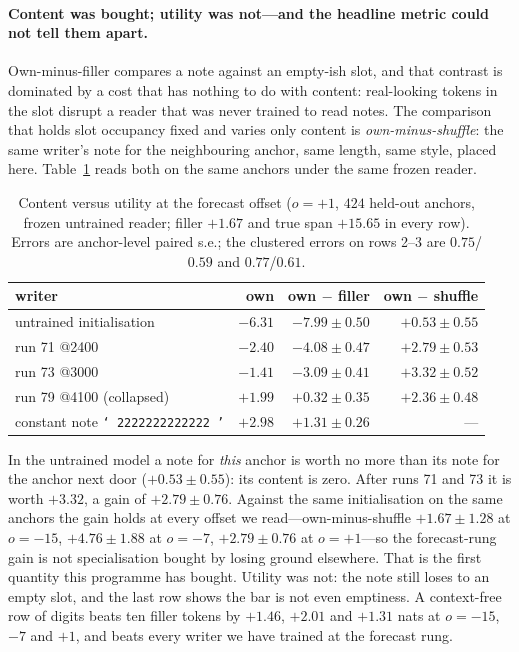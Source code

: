 \documentclass{article} %
\begin{document}
\paragraph{Content was bought; utility was not---and the headline metric could not tell them apart.}
Own-minus-filler compares a note against an empty-ish slot, and that contrast is dominated by a cost that
has nothing to do with content: real-looking tokens in the slot disrupt a reader that was never trained to
read notes. The comparison that holds slot occupancy fixed and varies only content is \emph{own-minus-shuffle}:
the same writer's note for the neighbouring anchor, same length, same style, placed here.
Table~\ref{tab:content} reads both on the same anchors under the same frozen reader.

\begin{table}[h]
\centering
\small
\caption{Content versus utility at the forecast offset ($o=+1$, $424$ held-out anchors, frozen untrained
reader; filler $+1.67$ and true span $+15.65$ in every row). Errors are anchor-level paired s.e.; the
clustered errors on rows 2--3 are $0.75$/$0.59$ and $0.77$/$0.61$.}
\label{tab:content}
\begin{tabular}{@{}lrrr@{}}
\toprule
writer & own & own $-$ filler & own $-$ shuffle \\
\midrule
untrained initialisation & $-6.31$ & $-7.99 \pm 0.50$ & $+0.53 \pm 0.55$ \\
run 71 @2400 & $-2.40$ & $-4.08 \pm 0.47$ & $+2.79 \pm 0.53$ \\
run 73 @3000 & $-1.41$ & $-3.09 \pm 0.41$ & $+3.32 \pm 0.52$ \\
run 79 @4100 (collapsed) & $+1.99$ & $+0.32 \pm 0.35$ & $+2.36 \pm 0.48$ \\
constant note \texttt{` 2222222222222 '} & $+2.98$ & $+1.31 \pm 0.26$ & --- \\
\bottomrule
\end{tabular}
\end{table}

In the untrained model a note for \emph{this} anchor is worth no more than its note for the anchor next door
($+0.53 \pm 0.55$): its content is zero. After runs 71 and 73 it is worth $+3.32$, a gain of
$+2.79 \pm 0.76$. Against the same initialisation on the same anchors the gain holds at every offset we
read---own-minus-shuffle $+1.67 \pm 1.28$ at $o=-15$, $+4.76 \pm 1.88$ at $o=-7$, $+2.79 \pm 0.76$ at
$o=+1$---so the forecast-rung gain is not specialisation bought by losing ground elsewhere. That is the first
quantity this programme has bought. Utility was not: the note still loses to an empty slot, and the last row
shows the bar is not even emptiness. A context-free row of digits beats ten filler tokens by $+1.46$, $+2.01$
and $+1.31$ nats at $o=-15$, $-7$ and $+1$, and beats every writer we have trained at the forecast rung.
\end{document}
